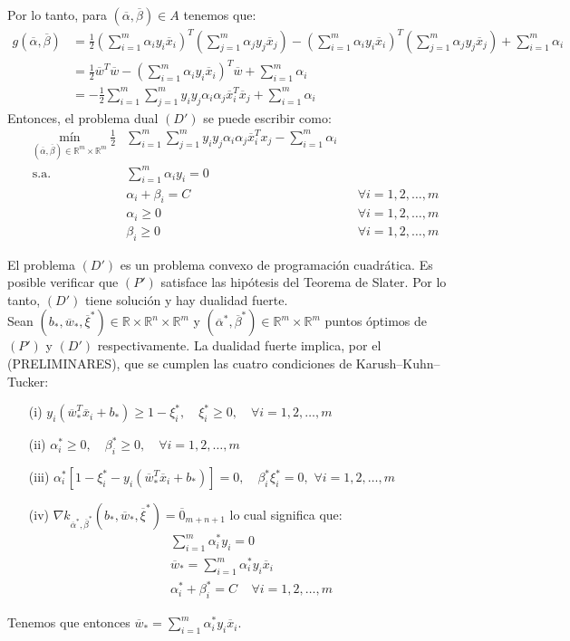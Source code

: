 \documentclass[11pt]{article}
\newcommand{\R}{\mathbb{R}}
\newcommand{\Rn}{\R^{n}}
\newcommand{\Rm}{\R^{m}}
\newcommand{\Runm}{\R\times\Rn\times\Rm}
\newcommand{\xiv}{\overline{\xi}}
\newcommand{\av}{\overline{\alpha}}
\newcommand{\bev}{\overline{\beta}}
\newcommand{\wv}{\overline{w}}
\newcommand{\x}{\overline{x}}
\newcommand{\Sm}{1,2,\ldots, m}
\newcommand{\bo}{b_{*}}
\newcommand{\wo}{\wv_{*}}
\newcommand{\avo}{\av^{*}}
\newcommand{\bevo}{\bev^{*}}
\newcommand{\xivo}{\xiv^{*}}
\newcommand{\alio}{\alpha_{i}^{*}}
\newcommand{\xiio}{\xi_{i}^{*}}
\newcommand{\beio}{\beta_{i}^{*}}
\newcommand{\ali}{\alpha_{i}}
\newcommand{\alj}{\alpha_{j}}
\newcommand{\bei}{\beta_{i}}
\begin{document}
Por lo tanto, para $(\av, \bev)\in A$ tenemos que:
\begin{equation*}
\begin{aligned}
g(\av, \bev)&=\frac{1}{2}\left(\sum_{i=1}^{m}\ali y_{i}\x_{i}\right)^{T}\left(\sum_{j=1}^{m}\alj y_{j}\x_{j}\right)-\left(\sum_{i=1}^{m}\ali y_{i}\x_{i}\right)^{T}\left(\sum_{j=1}^{m}\alj y_{j}\x_{j}\right)+\sum_{i=1}^{m}\ali\\
&=\frac{1}{2}\wv^{T}\wv-\left(\sum_{i=1}^{m}\ali y_{i}\x_{i}\right)^{T}\wv+\sum_{i=1}^{m}\ali\\
&=-\frac{1}{2}\sum_{i=1}^{m}\sum_{j=1}^{m}y_{i}y_{j}\ali\alj\x_{i}^{T}\x_{j}+\sum_{i=1}^{m}\ali
\end{aligned}
\end{equation*}
Entonces, el problema dual $(D')$ se puede escribir como:
\begin{equation*}
\begin{aligned}
\underset{(\av, \bev)\in\Rm\times\Rm}{\text{mín}}\ \frac{1}{2}&\sum_{i=1}^{m}\sum_{j=1}^{m}y_{i}y_{j}\ali\alj\x_{i}^{T}x_{j}-\sum_{i=1}^{m}\ali \\
\text{s.a.}\ \
& \sum_{i=1}^{m}\ali y_{i}=0\\
& \ali+\bei=C &&\forall i=\Sm\\
& \ali\geq0 &&\forall i=\Sm\\
& \bei\geq0 &&\forall i=\Sm
\end{aligned}
\end{equation*}

El problema $(D')$ es un problema convexo de programación cuadrática. Es posible verificar que $(P')$ satisface las hipótesis del Teorema de Slater. Por lo tanto, $(D')$ tiene solución y hay dualidad fuerte.\\

Sean $(\bo, \wo, \xivo)\in\Runm$ y $(\avo, \bevo)\in\Rm\times\Rm$ puntos óptimos de $(P')$ y $(D')$ respectivamente. La dualidad fuerte implica, por el (PRELIMINARES), que se cumplen las cuatro condiciones de Karush--Kuhn--Tucker:
\begin{itemize}
\item[(i)] $y_{i}(\wo^{T}\x_{i}+\bo)\geq1-\xiio,\quad \xiio\geq0,\quad \forall i=\Sm$
\item[(ii)] $\alio\geq0,\quad\beio\geq0,\quad\forall i=\Sm$
\item[(iii)] $\alio[1-\xiio-y_{i}(\wo^{T}\x_{i}+\bo)]=0,\quad\beio\xiio=0,$ $\forall i=\Sm$
\item[(iv)] $\nabla k_{\avo,\bevo}(\bo, \wo, \xivo)=\overline{0}_{m+n+1}$ lo cual significa que:
\begin{equation*}
\begin{aligned}
&\sum_{i=1}^{m}\alio y_{i}=0\\
&\wo=\sum_{i=1}^{m}\alio y_{i}\x_{i}\\
&\alio+\beio=C\ \ \ \ \ \forall i=\Sm
\end{aligned}
\end{equation*}
\end{itemize}
Tenemos que entonces $\wo=\sum_{i=1}^{m}\alio y_{i}\x_{i}$.
\end{document}
